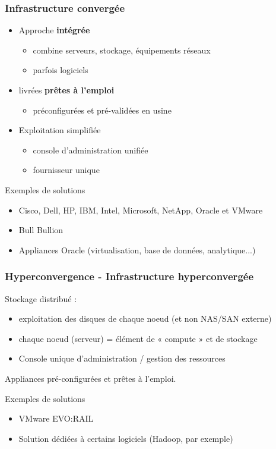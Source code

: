 \begin{frame}
\frametitle{Infrastructure convergée}
\begin{itemize}
  \item Approche \textbf{intégrée}
  \begin{itemize}
    \item combine serveurs, stockage, équipements réseaux
    \item parfois logiciels
  \end{itemize}
  \item livrées \textbf{prêtes à l’emploi}
  \begin{itemize}
    \item préconfigurées et pré-validées en usine
  \end{itemize}
  \item Exploitation simplifiée
  \begin{itemize}
    \item console d’administration unifiée
    \item fournisseur unique
  \end{itemize}
\end{itemize}

\begin{exampleblock}{Exemples de solutions}
  \begin{itemize}
    \item Cisco, Dell, HP, IBM, Intel, Microsoft, NetApp, Oracle et VMware
    \item Bull Bullion
    \item Appliances Oracle (virtualisation, base de données, analytique...)
  \end{itemize}
\end{exampleblock}

\end{frame}

\begin{frame}
  \frametitle{Hyperconvergence - Infrastructure hyperconvergée}
  Stockage distribué :
  \begin{itemize}
    \item exploitation des disques de chaque noeud (et non NAS/SAN externe)
    \item chaque noeud (serveur) = élément de « compute » et de stockage
    \item Console unique d'administration / gestion des ressources
  \end{itemize}

  Appliances pré-configurées et prêtes à l'emploi.

  \begin{exampleblock}{Exemples de solutions}
    \begin{itemize}
      \item VMware EVO:RAIL
      \item Solution dédiées à certains logiciels (Hadoop, par exemple)
    \end{itemize}
  \end{exampleblock}
\end{frame}



